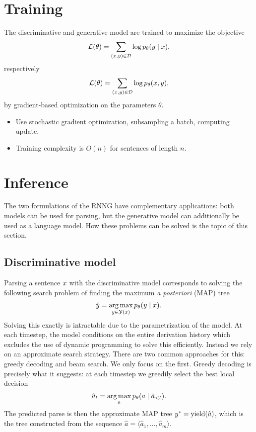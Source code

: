 \section{Training}
  The discriminative and generative model are trained to maximize the objective
  \begin{align*}
    \mathcal{L}(\theta) = \sum_{(x, y) \in \mathcal{D}} \log p_{\theta} (y \mid x),
  \end{align*}
  respectively
  \begin{align*}
    \mathcal{L}(\theta) = \sum_{(x, y) \in \mathcal{D}} \log p_{\theta} (x, y),
  \end{align*}
  by gradient-based optimization on the parameters $\theta$.
  \begin{itemize}
    \item Use stochastic gradient optimization, subsampling a batch, computing update.
    \item Training complexity is $O(n)$ for sentences of length $n$.
  \end{itemize}

\section{Inference}
  The two formulations of the RNNG have complementary applications: both models can be used for parsing, but the generative model can additionally be used as a language model. How these problems can be solved is the topic of this section.

  \subsection{Discriminative model}
    Parsing a sentence $x$ with the discriminative model corresponds to solving the following search problem of finding the maximum \textit{a posteriori} (MAP) tree
    \begin{align*}
      \hat{y} = \operatorname*{arg\,max}_{ y \in \mathcal{Y}(x) } p_{\theta}(y \mid x).
    \end{align*}
    Solving this exactly is intractable due to the parametrization of the model. At each timestep, the model conditions on the entire derivation history which excludes the use of dynamic programming to solve this efficiently. Instead we rely on an approximate search strategy. There are two common approaches for this: greedy decoding and beam search. We only focus on the first. Greedy decoding is precisely what it suggests: at each timestep we greedily select the best local decision
    \begin{align*}
      \hat{a}_t = \operatorname*{arg\,max}_{a} p_{\theta}(a \mid \hat{a}_{< t}).
    \end{align*}
    The predicted parse is then the approximate MAP tree $y^* = \text{yield}(\hat{a})$, which is the tree constructed from the sequence $\hat{a} = \langle \hat{a}_1, \dots, \hat{a}_m \rangle$.

